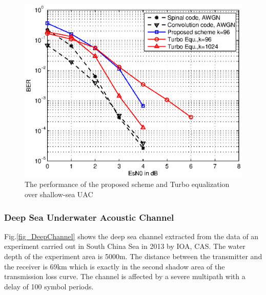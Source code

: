 \documentclass[conference]{IEEEtran}
\begin{document}
\begin{figure}[ht]
\centering
\includegraphics[width=\columnwidth]{ShallowQPSKComparison.eps}
\caption{The performance of the proposed scheme and Turbo equalization over shallow-sea UAC}
\label{fig_ShallowQPSKComparison}
\end{figure}
\subsubsection{Deep Sea Underwater Acoustic Channel}
Fig.\ref{fig_DeepChannel} shows the deep sea channel extracted from the data of an experiment carried out in South China Sea in 2013 by IOA, CAS. The water depth of the experiment area is 5000m. The distance between the transmitter and the receiver is 69km which is exactly in the second  shadow area of the transmission loss curve. The channel is affected by a severe multipath with a delay of 100 symbol periods.
\end{document}
